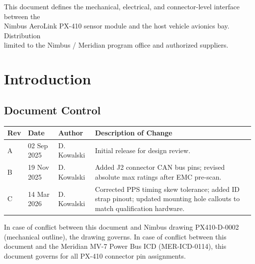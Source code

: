 \documentclass[11pt,a4paper]{scrreprt}
\begin{document}
\begin{titlepage}
\vfill
\begin{center}
\small\color{icdsteel}\sffamily
This document defines the mechanical, electrical, and connector-level interface between the\\
Nimbus AeroLink PX-410 sensor module and the host vehicle avionics bay. Distribution\\
limited to the Nimbus / Meridian program office and authorized suppliers.
\end{center}
\vspace{0.6cm}
\restoregeometry
\end{titlepage}

\tableofcontents

\chapter{Introduction}

\section{Document Control}
\begin{table}[H]
\centering
\begin{tabularx}{\textwidth}{@{}l l l Y@{}}
\toprule
{}
\color{white}\bfseries Rev & \color{white}\bfseries Date & \color{white}\bfseries Author & \color{white}\bfseries Description of Change \\
\midrule
A & 02 Sep 2025 & D. Kowalski & Initial release for design review. \\
B & 19 Nov 2025 & D. Kowalski & Added J2 connector CAN bus pins; revised absolute max ratings after EMC pre-scan. \\
C & 14 Mar 2026 & D. Kowalski & Corrected PPS timing skew tolerance; added ID strap pinout; updated mounting hole callouts to match qualification hardware. \\
\bottomrule
\end{tabularx}
\end{table}

\vspace{4pt}
\begin{noticebox}
In case of conflict between this document and Nimbus drawing PX410-D-0002 (mechanical
outline), the drawing governs. In case of conflict between this document and the Meridian
MV-7 Power Bus ICD (MER-ICD-0114), this document governs for all PX-410 connector pin
assignments.
\end{noticebox}
\end{document}
